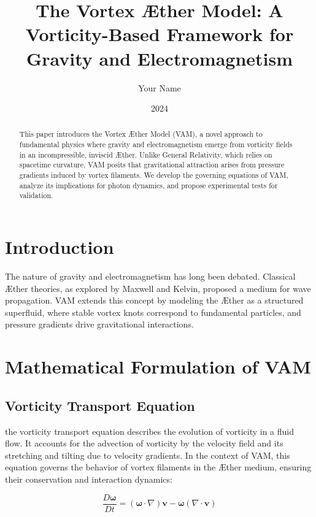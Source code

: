 \documentclass[12pt]{article}
\title{The Vortex \AE ther Model: A Vorticity-Based Framework for Gravity and Electromagnetism}
\author{Your Name}
\date{2024}
\begin{document}
    \maketitle

    \begin{abstract}
        This paper introduces the Vortex \AE ther Model (VAM), a novel approach to fundamental physics where gravity and electromagnetism emerge from vorticity fields in an incompressible, inviscid \AE ther. Unlike General Relativity, which relies on spacetime curvature, VAM posits that gravitational attraction arises from pressure gradients induced by vortex filaments. We develop the governing equations of VAM, analyze its implications for photon dynamics, and propose experimental tests for validation.
    \end{abstract}

    \section{Introduction}
    The nature of gravity and electromagnetism has long been debated. Classical \AE ther theories, as explored by Maxwell and Kelvin, proposed a medium for wave propagation. VAM extends this concept by modeling the \AE ther as a structured superfluid, where stable vortex knots correspond to fundamental particles, and pressure gradients drive gravitational interactions.

    \section{Mathematical Formulation of VAM}

    \subsection{Vorticity Transport Equation}

    the vorticity transport equation describes the evolution of vorticity in a fluid flow. It accounts for the advection of vorticity by the velocity field and its stretching and tilting due to velocity gradients. In the context of VAM, this equation governs the behavior of vortex filaments in the \AE ther medium, ensuring their conservation and interaction dynamics:

    \begin{equation}
        \frac{D\boldsymbol{\omega}}{Dt} = (\boldsymbol{\omega} \cdot \nabla) \mathbf{v} - \boldsymbol{\omega} (\nabla \cdot \mathbf{v})
    \end{equation}
\end{document}
